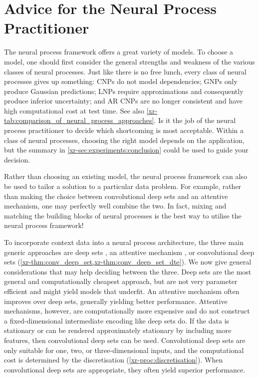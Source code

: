\documentclass[12pt, twoside]{report}
\newcommand{\xrprefix}[1]{xr-#1}
\begin{document}
\section{Advice for the Neural Process Practitioner}

The neural process framework offers a great variety of models.
To choose a model, one should first consider the general strengths and weakness of the various classes of neural processes.
Just like there is no free lunch,
every class of neural processes gives up something:
CNPs do not model dependencies;
GNPs only produce Gaussian predictions;
LNPs require approximations and consequently produce inferior uncertainty; 
and AR CNPs are no longer consistent and have high computational cost at test time.
See also
\cref{\xrprefix{tab:comparison_of_neural_process_approaches}}.
Is it the job of the neural process practitioner to decide which shortcoming is most acceptable.
Within a class of neural processes, choosing the right model depends on the application,
but the summary in \cref{\xrprefix{sec:experiments:conclusion}} could be used to guide your decision.

Rather than choosing an existing model, the neural process framework can also be used to tailor a solution to a particular data problem.
For example, rather than making the choice between convolutional deep sets and an attentive mechanism,
one may perfectly well combine the two.
In fact,
mixing and matching the building blocks of neural processes
is the best way to utilise the neural process framework!

To incorporate context data into a neural process architecture,
the three main generic approaches are
deep sets \parencite[\cref{\xrprefix{thm:deep_set}};][]{Zaheer:2017:Deep_Sets,Edwards:2017:Towards_a_Neural_Statistician,Garnelo:2018:Neural_Processes,Wagstaff:2019:On_the_Limitations_of_Representing},
an attentive mechanism \parencite{Bahdanau:2015:Neural_Machine_Translation_by_Jointly,Vaswani:2017:Attention_Is_All_You_Need,Kim:2019:Attentive_Neural_Processes},
or convolutional deep sets (\cref{\xrprefix{thm:conv_deep_set},\xrprefix{thm:conv_deep_set_dte}}).
We now give general considerations that may help deciding between the three.
Deep sets are the most general and computationally cheapest approach, but are not very parameter efficient and might yield models that underfit.
An attentive mechanism often improves over deep sets, generally yielding better performance.
Attentive mechanisms, however, are computationally more expensive
and do not construct a fixed-dimensional intermediate encoding like deep sets do. %
If the data is stationary or can be rendered approximately stationary by including more features, then
convolutional deep sets can be used.
Convolutional deep sets are only suitable for one, two, or three-dimensional inputs, and the computational cost is determined by the discretisation (\cref{\xrprefix{proc:discretisation}}).
When convolutional deep sets are appropriate, they often yield superior performance.
\end{document}
